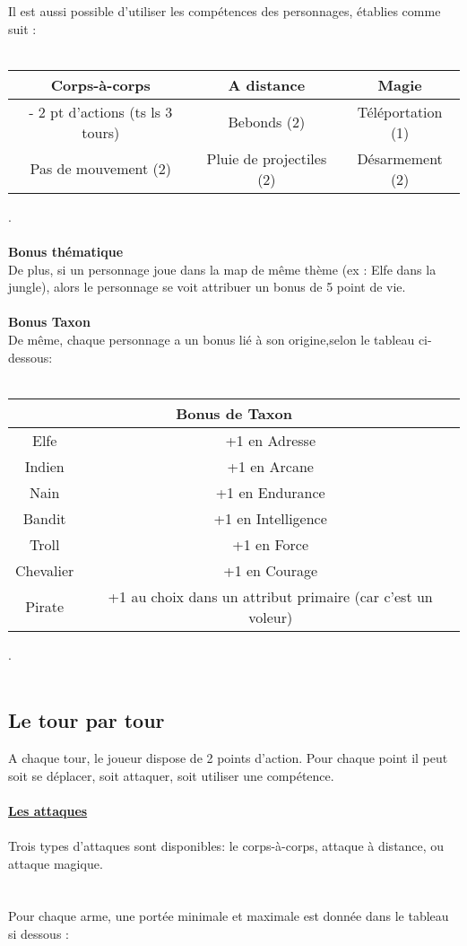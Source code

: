 \documentclass[a4paper,12pt]{report}
\begin{document}
	
	Il est aussi possible d'utiliser les compétences des personnages, établies comme suit : \\ \\
	\begin{tabular}{|c|c|c|}
		\hline
		\textbf{Corps-à-corps} & \textbf{A distance} & \textbf{Magie} \\
		\hline
		- 2 pt d'actions (ts ls 3 tours) & Bebonds (2) &Téléportation (1) \\
		\hline
		Pas de mouvement (2)& Pluie de projectiles (2) & Désarmement (2) \\
		\hline
	\end{tabular}
	. \\ \\
	\textbf{Bonus thématique}\\
	De plus, si un personnage joue dans la map de même thème (ex : Elfe dans la jungle), alors le personnage se voit attribuer un bonus de 5 point de vie. \\ \\
	\textbf{Bonus Taxon} \\ 
	De même, chaque personnage a un bonus lié à son origine,selon le tableau ci-dessous: \\ \\
	
	
	\begin{tabular}{|c|c|}
		\hline
		\multicolumn{2}{|c|}{Bonus de Taxon} \\
		\hline
		Elfe &  +1 en Adresse \\
		\hline
		Indien & +1 en Arcane \\
		\hline
		Nain & +1 en Endurance \\
		\hline
		Bandit & +1 en  Intelligence\\
		\hline
		Troll & +1 en Force \\
		\hline
		Chevalier & +1 en Courage \\
		\hline
		Pirate & +1 au choix dans un attribut primaire (car c'est un voleur)\\
		\hline
	\end{tabular}
	.\\ \\
	
	
	
	
	
	\subsection{Le tour par tour} 
	A chaque tour, le joueur dispose de 2 points d'action. Pour chaque point il peut soit se déplacer, soit attaquer, soit utiliser une compétence.\\ \\
	\textbf{\underline{Les attaques}}\\ \\
	Trois types d'attaques sont disponibles: le corps-à-corps, attaque à distance, ou attaque magique.\\ \\ \\ Pour chaque arme, une portée minimale et maximale est donnée dans le tableau si dessous : \\ 
	
\end{document}
